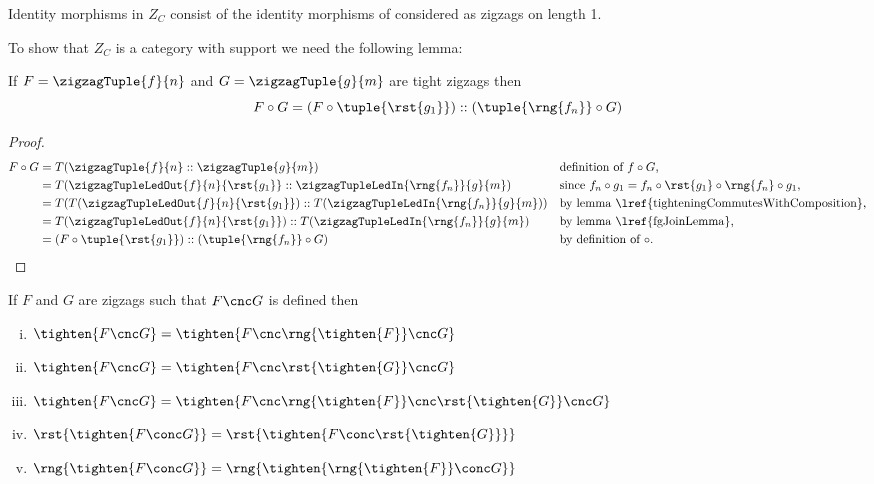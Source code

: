 Identity morphisms in $Z_C$ consist of the identity morphisms of \catcw considered 
as zigzags on length 1.

\begin{worktt}

To show that $Z_C$ is a category with support we need the following lemma:
\begin{lemma}
If $F=\zigzagTuple{f}{n}$ and $G=\zigzagTuple{g}{m}$ are tight zigzags
then 
\[
F \circ G = (F \circ \tuple{\rst{g_1}}) :: (\tuple{\rng{f_n}} \circ G)
\]
\end{lemma}
\begin{proof}
\begin{align*}
F \circ G &= T(\zigzagTuple{f}{n}::\zigzagTuple{g}{m})
           &&\mbox{definition of $f \circ G$,}\\
          &= T(\zigzagTupleLedOut{f}{n}{\rst{g_1}} :: \zigzagTupleLedIn{\rng{f_n}}{g}{m} )
          && \mbox{since $f_n \circ g_1 = f_n \circ \rst{g_1} \circ \rng{f_n} \circ g_1$,} \\
          &=  T(T(\zigzagTupleLedOut{f}{n}{\rst{g_1}}) :: 
                           T(\zigzagTupleLedIn{\rng{f_n}}{g}{m}) )
          && \mbox{by lemma \lref{tighteningCommutesWithComposition},}\\
          &= T(\zigzagTupleLedOut{f}{n}{\rst{g_1}}) :: 
                           T(\zigzagTupleLedIn{\rng{f_n}}{g}{m}) 
          && \mbox{by lemma \lref{fgJoinLemma},}\\
          &= (F \circ \tuple{\rst{g_1}}) :: (\tuple{\rng{f_n}} \circ G)
          && \mbox{by definition of $\circ$.}
\end{align*}
\end{proof}
\end{worktt}


\newcommand{\abrst}[1]{\rst{\tighten{#1}}}
\newcommand{\abrng}[1]{\rng{\tighten{#1}}}

\begin{lemma}
If $F$ and $G$ are zigzags such that $F \cnc G$ is defined then
\begin{enumerate}[(i)]
\item {} 
$\tighten{F \cnc G} = \tighten{F \cnc \abrng{F} \cnc G}$
\item {}
$\tighten{F \cnc G} = \tighten{F \cnc \abrst{G} \cnc G}$
\item {}
$\tighten{F \cnc G} = \tighten{F \cnc \abrng{F} \cnc \abrst{G} \cnc G}$
\item {}
$\abrst{F \conc G} = \abrst{F \conc \abrst{G}}$
\item {}
$\abrng{F \conc G} = \abrng{\abrng{F} \conc G}$
\end{enumerate}
\end{lemma}


